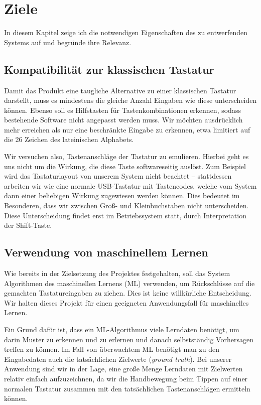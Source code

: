 \chapter{Ziele} 

In diesem Kapitel zeige ich die notwendigen Eigenschaften des zu entwerfenden
Systems auf und begründe ihre Relevanz.

\section{Kompatibilität zur klassischen Tastatur}

Damit das Produkt eine taugliche Alternative zu einer klassischen Tastatur
darstellt, muss es mindestens die gleiche Anzahl Eingaben wie diese
unterscheiden können.  Ebenso soll es Hilfstasten für Tastenkombinationen
erkennen, sodass bestehende Software nicht angepasst werden muss. Wir möchten
ausdrücklich mehr erreichen als nur eine beschränkte Eingabe zu erkennen, etwa
limitiert auf die 26 Zeichen des lateinischen Alphabets.

Wir versuchen also, Tastenanschläge der Tastatur zu emulieren. Hierbei geht es
uns nicht um die Wirkung, die diese Taste softwareseitig auslöst. Zum Beispiel
wird das Tastaturlayout von unserem System nicht beachtet -- stattdessen
arbeiten wir wie eine normale USB-Tastatur mit Tastencodes, welche vom System
dann einer beliebigen Wirkung zugewiesen werden können. Dies bedeutet im
Besonderen, dass wir zwischen Groß- und Kleinbuchstaben nicht unterscheiden.
Diese Unterscheidung findet erst im Betriebssystem statt, durch Interpretation
der Shift-Taste.

\section{Verwendung von maschinellem Lernen}

Wie bereits in der Zielsetzung des Projektes festgehalten, soll das System
Algorithmen des maschinellen Lernens (ML) verwenden, um Rückschlüsse auf die
gemachten Tastatureingaben zu ziehen. Dies ist keine willkürliche Entscheidung.
Wir halten dieses Projekt für einen geeigneten Anwendungsfall für maschinelles
Lernen.

Ein Grund dafür ist, dass ein ML-Algorithmus viele Lerndaten benötigt, um darin
Muster zu erkennen und zu erlernen und danach selbstständig Vorhersagen treffen
zu können. Im Fall von überwachtem ML benötigt man zu den Eingabedaten auch die
tatsächlichen Zielwerte (\emph{ground truth}). Bei unserer Anwendung sind wir
in der Lage, eine große Menge Lerndaten mit Zielwerten relativ einfach
aufzuzeichnen, da wir die Handbewegung beim Tippen auf einer normalen Tastatur
zusammen mit den tatsächlichen Tastenanschlägen ermitteln können.


